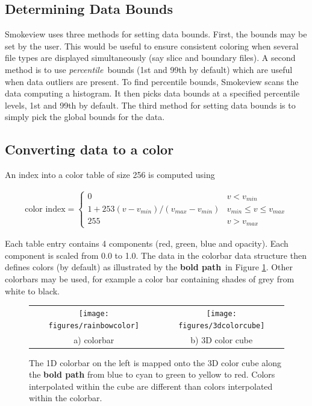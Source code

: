 \documentclass[11pt,twoside]{book}
\newcommand{\figoptions}{htp}
\begin{document}
\subsection{Determining Data Bounds}Smokeview uses three methods for setting data bounds.  First, the bounds may be set by the user.  This would be useful to ensure consistent coloring when several file types are displayed simultaneously (say slice and boundary files).  A second method is to use {\em percentile}\ bounds (1st and 99th by default) which are useful when data outliers are present.  To find percentile bounds, Smokeview scans the data computing a histogram.  It then picks data bounds at a specified percentile levels, 1st and 99th by default.  The third method for setting data bounds is to simply pick the global bounds for the data.

\subsection{Converting data to a color}
An index into a color table of size 256 is computed using

\begin{eqnarray*}
\mbox{color index}=\left\{
\begin{array}{ll}
  0 & v < v_{min}\\
  1+253(v-v_{min})/(v_{max}-v_{min}) & v_{min}\le v \le v_{max} \\
  255 & v > v_{max}
\end{array}
\right.
\end{eqnarray*}

Each table entry contains 4 components (red, green, blue and opacity).  Each component is scaled from 0.0 to 1.0.  The data in the colorbar data structure then defines colors (by default) as illustrated by the {\bf bold path}\ in Figure \ref{colorbarinfo}.  Other colorbars may be used, for example a color bar containing shades of grey from white to black.


\begin{figure}[\figoptions]
\begin{center}
\begin{tabular}{cc}
\texttt{[image: figures/rainbowcolor]}&\texttt{[image: figures/3dcolorcube]}\\
a) colorbar&b) 3D color cube\\
\end{tabular}
\end{center}
\caption[1D colorbar and 3D color cube]{The 1D colorbar on the left is mapped onto the 3D color cube
along the {\bf bold path} from blue to cyan to green to yellow to red.  Colors interpolated within the cube are different than colors interpolated within the colorbar.}
\label{colorbarinfo}%
\end{figure}
\end{document}
